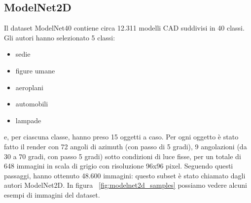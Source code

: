 \documentclass[italian,12pt,a4paper,oneside,final]{report}
\begin{document}
\subsection{ModelNet2D}
Il dataset ModelNet40\cite{dataset:modelnet40} contiene circa 12.311 modelli CAD suddivisi in 40 classi.
Gli autori hanno selezionato 5 classi:
\begin{itemize}
	\item sedie
	\item figure umane
	\item aeroplani
	\item automobili
	\item lampade
\end{itemize}
e, per ciascuna classe, hanno preso 15 oggetti a caso.
Per ogni oggetto è stato fatto il render con 72 angoli di azimuth (con passo di 5 gradi), 9 angolazioni (da 30 a 70 gradi, con passo 5 gradi) sotto condizioni di luce fisse, per un totale di 648 immagini in scala di grigio con risoluzione 96x96 pixel.
Seguendo questi passaggi, hanno ottenuto 48.600 immagini: questo subset è stato chiamato dagli autori ModelNet2D.
In figura ~\ref{fig:modelnet2d_samples} possiamo vedere alcuni esempi di immagini del dataset.
\end{document}
